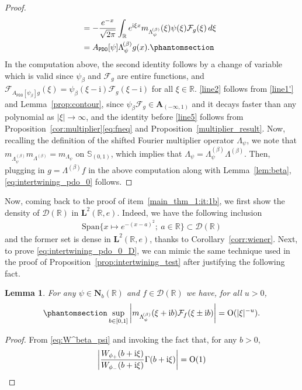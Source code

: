 \documentclass[12pt]{amsart}
\newcommand{\hlabel}{\phantomsection\label}
\newcommand{\hptg}[2]{\hypertarget{#1}{#2}}
\numberwithin{equation}{section}
\newcommand{\bb}{\mathbb}
\newcommand{\cc}{\mathcal}
\newcommand{\ttt}{\mathtt}
\newcommand{\bmrm}[2][2]{\mathbf{#2}^{#1}}
\newcommand{\Span}{\mathrm{Span}}
\newcommand{\fou}{\mathcal{F}}
\newcommand{\A}{\mathbf{A}}
\renewcommand{\i}{\mathrm{i}}
\newcommand{\LRe}{\bmrm{L}(\bb{R},e)}
\newcommand{\NN}{\mathbf{N}}
\newtheorem{lem}[thm]{Lemma}
\theoremstyle{definition}
\theoremstyle{assump}
\theoremstyle{remark}
\begin{document}
{\begin{proof}
\begin{align}
&=-\frac{e^{-x}}{\sqrt{2\pi}}\int_{\bb{R}}e^{{\rm{i}}\xi   x}m_{\Lambda^{\!(\beta)}_\psi}(\xi)\psi(\xi)\mathcal{F}_{g}(\xi)\,d\xi \ \ \nonumber \\
&= A_\ttt{PDO}[\psi]\Lambda^{\!(\beta)}_\psi g(x). \hlabel{line5}
\end{align}
\hptg{C42}{In the computation above, the second identity follows by a change of variable which is valid since $\psi_\beta$ and $\fou_{g}$ are entire functions, and $\fou_{A_\ttt{PDO}[\psi_\beta]g}(\xi)=\psi_\beta(\xi-\i)\fou_g(\xi-\i)$ for all $\xi\in\bb R$.} \eqref{line2} follows from \eqref{line1'} and Lemma~\ref{prop:contour}, since $\psi_\beta\fou_{g}\in\A_{(-\infty,1)}$ and it decays faster than any polynomial as $|\xi|\to\infty$, and the identity before \eqref{line5} follows from Proposition~\ref{cor:multiplier}\eqref{eq:fneq} and Proposition~\ref{multiplier_result}. Now, recalling the definition of the shifted Fourier multiplier operator $\Lambda_\psi$, we note that $m_{\Lambda^{\!(\beta)}_\psi} m_{\Lambda^{\!(\beta)}}=m_{\Lambda_\psi}$ on $\bb{S}_{(0,1)}$, which implies that $\Lambda_\psi=\Lambda^{\!(\beta)}_\psi\Lambda^{\!(\beta)}$. Then, plugging in $g=\Lambda^{\!(\beta)}f$ in the above computation along with Lemma~\ref{lem:beta}, \eqref{eq:intertwining_pdo_0} follows.
\end{proof}
Now, coming back to the proof of item~\eqref{main_thm_1:it:1b}, we first show the density of $\cc{D}(\bb R)$ in $\LRe$. Indeed, we have the following inclusion
\begin{align*}
	\Span\{x\mapsto e^{-(x-a)^2}; \: a\in\bb R\}\subset \cc{D}(\bb R)
\end{align*}
and the former set is dense in $\LRe$, thanks to Corollary~\ref{corr:wiener}. Next, to prove \eqref{eq:intertwining_pdo_0_D}, we can mimic the same technique used in the proof of Proposition~\ref{prop:intertwining_test} after justifying the following fact.
\begin{lem}
	For any $\psi\in\NN_b(\bb R)$ and $f\in\cc{D}(\bb R)$ we have, for all $u>0$,
	\begin{align}\hlabel{eq:estimate_D_psi}
		\sup_{b\in [0,1]}\left|m_{\Lambda^{\!(\beta)}_\psi}(\xi+\i b)\cc{F}_f(\xi\pm\i b)\right|={\rm O}(|\xi|^{-u}).
	\end{align}
\end{lem}
\begin{proof}
	From \eqref{eq:W^beta_psi} and invoking the fact that, for any $b>0$,
	\begin{align*}
		\left|\frac{W_{\phi_+}(b+\i\xi)}{W_{\phi_-}(b+\i\xi)}\Gamma(b+\i\xi)\right|={\rm O}(1)

\end{align*}
\end{proof}}
\end{document}
